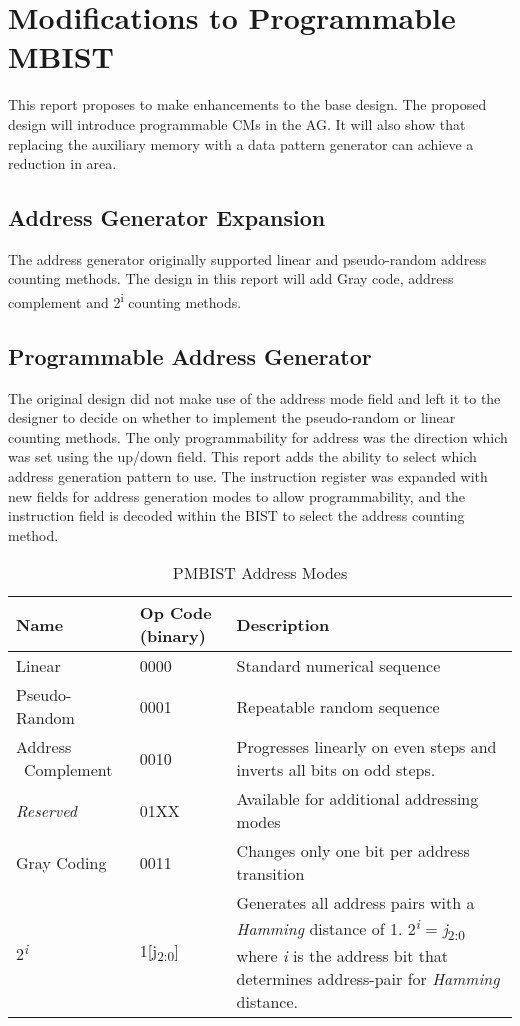 \section{Modifications to Programmable MBIST}
\label{sect:bg-modifications}
This report proposes to make enhancements to the base design.  The proposed design will introduce programmable CMs in the AG.  It will also show that replacing the auxiliary memory with a data pattern generator can achieve a reduction in area.

\subsection{Address Generator Expansion}
The address generator originally supported linear and pseudo-random address counting methods.  The design in this report will add Gray code, address complement and 2\textsuperscript{i} counting methods.

\subsection{Programmable Address Generator}
The original design did not make use of the address mode field and left it to the designer to decide on whether to implement the pseudo-random or linear counting methods.  The only programmability for address was the direction which was set using the up/down field.  This report adds the ability to select which address generation pattern to use.  The instruction register was expanded with new fields for address generation modes to allow programmability, and the instruction field is decoded within the BIST to select the address counting method.

\begin{table}[hbt]
  \caption{PMBIST Address Modes}
  \centering
 \begin{tabular}{|p{1in}|p{0.75in}|p{3in}|}
  \hline
  Name & Op Code (binary) & Description \\ [0.5ex]
  \hline\hline
  Linear              & 0000 & Standard numerical sequence  \\ 
  \hline
  Pseudo-Random       & 0001 & Repeatable random sequence \\ 
  \hline
  Address \ Complement  & 0010 & Progresses linearly on even steps and inverts all bits on odd steps.\\ 
  \hline
  \textit{Reserved}            & 01XX & Available for additional addressing modes \\ 
  \hline
  Gray Coding         & 0011 & Changes only one bit per address transition \\ 
  \hline
  2\textsuperscript{\textit{i}}& 1[j\textsubscript{2:0}] & Generates all address pairs with a \textit{Hamming} distance of 1.  2\textsuperscript{\textit{i}} = \textit{j}\textsubscript{2:0} where \textit{i} is the address bit that determines address-pair for \textit{Hamming} distance. \\ 
  \hline
 \end{tabular}
\label{tab:addrmode}
\end{table}

